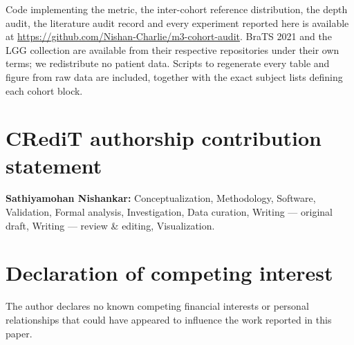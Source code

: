 Code implementing the metric, the inter-cohort reference distribution, the
depth audit, the literature audit record and
every experiment reported here is available at
\url{https://github.com/Nishan-Charlie/m3-cohort-audit}. BraTS 2021
\citep{baid2021rsna} and the LGG collection \citep{buda2019association} are
available from their respective repositories under their own terms; we
redistribute no patient data. Scripts to regenerate every table and figure from
raw data are included, together with the exact subject lists defining each
cohort block.

\section*{CRediT authorship contribution statement}

\textbf{Sathiyamohan Nishankar:} Conceptualization, Methodology, Software,
Validation, Formal analysis, Investigation, Data curation, Writing --- original
draft, Writing --- review \& editing, Visualization.

\section*{Declaration of competing interest}

The author declares no known competing financial interests or personal
relationships that could have appeared to influence the work reported in this
paper.
